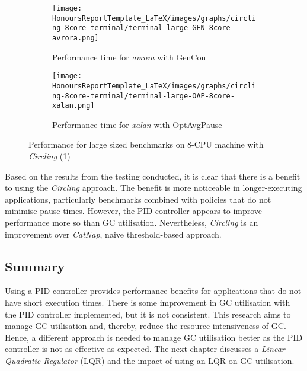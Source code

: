 \newpage
\begin{figure}[H]
\begin{subfigure}{1\textwidth}
\texttt{[image: HonoursReportTemplate\_LaTeX/images/graphs/circling-8core-terminal/terminal-large-GEN-8core-avrora.png]}
       \caption{Performance time for \emph{avrora} with GenCon}
\end{subfigure}

\begin{subfigure}{1\textwidth}
\texttt{[image: HonoursReportTemplate\_LaTeX/images/graphs/circling-8core-terminal/terminal-large-OAP-8core-xalan.png]}
       \caption{Performance time for \emph{xalan} with OptAvgPause}
\end{subfigure}

    \caption{Performance for large sized benchmarks on 8-CPU machine with \emph{Circling} (1)}
    \label{fig:Circling-performance}
\end{figure}
\newpage
Based on the results from the testing conducted, it is clear that there
is a benefit to using the \emph{Circling} approach. The benefit is more
noticeable in longer-executing applications, particularly benchmarks
combined with policies that do not minimise pause times. However, the
PID controller appears to improve performance more so than GC
utilisation. Nevertheless, \emph{Circling} is an improvement over
\emph{CatNap}, naive threshold-based approach.

\subsection{Summary}
Using a PID controller provides performance benefits for applications
that do not have short execution times. There is some improvement in GC
utilisation with the PID controller implemented, but it is not
consistent. This research aims to manage GC utilisation and, thereby,
reduce the resource-intensiveness of GC. Hence, a different approach is
needed to manage GC utilisation better as the PID controller is not as
effective as expected. The next chapter discusses a \emph{Linear-Quadratic
Regulator} (LQR) and the impact of using an LQR on GC utilisation.
